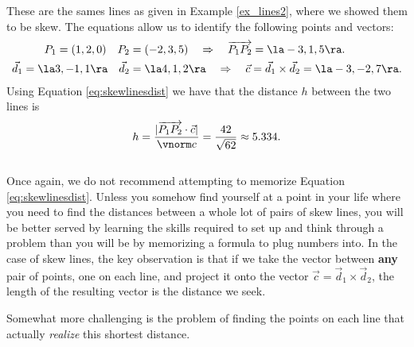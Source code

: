 {These are the sames lines as given in Example \ref{ex_lines2}, where we showed them to be skew. The equations allow us to identify the following points and vectors:
\begin{align*}
P_1 = (1,2,0)\quad P_2 &= (-2,3,5) \quad \Rightarrow \quad \overrightarrow{P_1P_2} = \la -3,1,5\ra.\\
\vec d_1 = \la 3,-1,1\ra \quad \vec d_2 &= \la 4,1,2\ra \quad \Rightarrow \quad \vec c = \vec d_1\times \vec d_2 = \la -3,-2,7\ra.
\end{align*}
Using Equation \eqref{eq:skewlinesdist} we have that the distance $h$ between the two lines is
\[
h = \frac{|\overrightarrow{P_1P_2}\cdot \vec c|}{\vnorm c}=\frac{42}{\sqrt{62}}\approx 5.334.
\]
}\\

Once again, we do not recommend attempting to memorize Equation \eqref{eq:skewlinesdist}. Unless you somehow find yourself at a point in your life where you need to find the distances between a whole lot of pairs of skew lines, you will be better served by learning the skills required to set up and think through a problem than you will be by memorizing a formula to plug numbers into. In the case of skew lines, the key observation is that if we take the vector between \textbf{any} pair of points, one on each line, and project it onto the vector $\vec c = \vec{d}_1\times\vec{d}_2$, the length of the resulting vector is the distance we seek.

Somewhat more challenging is the problem of finding the points on each line that actually \textit{realize} this shortest distance.\\

